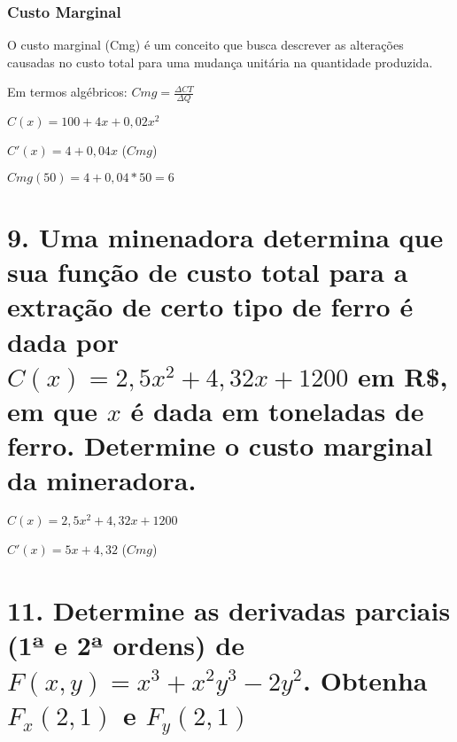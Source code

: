 \hypertarget{custo-marginal}{%
\subsubsection{Custo Marginal}\label{custo-marginal}}

O custo marginal (Cmg) é um conceito que busca descrever as alterações
causadas no custo total para uma mudança unitária na quantidade
produzida.

Em termos algébricos: \(Cmg=\frac{ΔCT}{ΔQ}\)

\(C(x) = 100+4x+0,02x^2\)

\(C'(x)=4+0,04x\) (\(Cmg\))

\(Cmg(50)=4+0,04*50=6\)

\hypertarget{uma-minenadora-determina-que-sua-funuxe7uxe3o-de-custo-total-para-a-extrauxe7uxe3o-de-certo-tipo-de-ferro-uxe9-dada-por-cx25x2432x-1200-em-r-em-que-x-uxe9-dada-em-toneladas-de-ferro.-determine-o-custo-marginal-da-mineradora.}{%
\section{\texorpdfstring{9. Uma minenadora determina que sua função de
custo total para a extração de certo tipo de ferro é dada por
\(C(x)=2,5x^2+4,32x +1200\) em R\$, em que \(x\) é dada em toneladas de
ferro. Determine o custo marginal da
mineradora.}{9. Uma minenadora determina que sua função de custo total para a extração de certo tipo de ferro é dada por C(x)=2,5x\^{}2+4,32x +1200 em R\$, em que x é dada em toneladas de ferro. Determine o custo marginal da mineradora.}}\label{uma-minenadora-determina-que-sua-funuxe7uxe3o-de-custo-total-para-a-extrauxe7uxe3o-de-certo-tipo-de-ferro-uxe9-dada-por-cx25x2432x-1200-em-r-em-que-x-uxe9-dada-em-toneladas-de-ferro.-determine-o-custo-marginal-da-mineradora.}}

\(C(x)=2,5x^2+4,32x +1200\)

\(C'(x)=5x+4,32\) (\(Cmg\))

\hypertarget{determine-as-derivadas-parciais-1uxaa-e-2uxaa-ordens-de-fxyx3x2y3-2y2.-obtenha-f_x21-e-f_y21}{%
\section{\texorpdfstring{11. Determine as derivadas parciais (1ª e 2ª
ordens) de \(F(x,y)=x^3+x^2y^3-2y^2\). Obtenha \(F_x(2,1)\) e
\(F_y(2,1)\)}{11. Determine as derivadas parciais (1ª e 2ª ordens) de F(x,y)=x\^{}3+x\^{}2y\^{}3-2y\^{}2. Obtenha F\_x(2,1) e F\_y(2,1)}}\label{determine-as-derivadas-parciais-1uxaa-e-2uxaa-ordens-de-fxyx3x2y3-2y2.-obtenha-f_x21-e-f_y21}}

